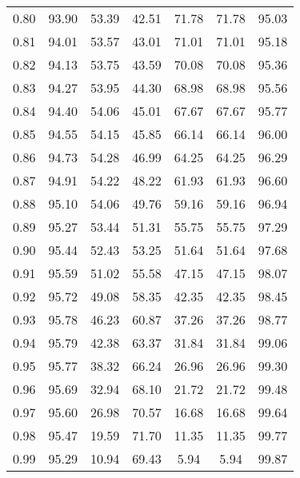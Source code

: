 \begin{tabular}{|c|c|c|c|c|c|c|}
      0.80 &     93.90 &     53.39 &      42.51 &   71.78 &      71.78 &         95.03 \\
      0.81 &     94.01 &     53.57 &      43.01 &   71.01 &      71.01 &         95.18 \\
      0.82 &     94.13 &     53.75 &      43.59 &   70.08 &      70.08 &         95.36 \\
      0.83 &     94.27 &     53.95 &      44.30 &   68.98 &      68.98 &         95.56 \\
      0.84 &     94.40 &     54.06 &      45.01 &   67.67 &      67.67 &         95.77 \\
      0.85 &     94.55 &     54.15 &      45.85 &   66.14 &      66.14 &         96.00 \\
      0.86 &     94.73 &     54.28 &      46.99 &   64.25 &      64.25 &         96.29 \\
      0.87 &     94.91 &     54.22 &      48.22 &   61.93 &      61.93 &         96.60 \\
      0.88 &     95.10 &     54.06 &      49.76 &   59.16 &      59.16 &         96.94 \\
      0.89 &     95.27 &     53.44 &      51.31 &   55.75 &      55.75 &         97.29 \\
      0.90 &     95.44 &     52.43 &      53.25 &   51.64 &      51.64 &         97.68 \\
      0.91 &     95.59 &     51.02 &      55.58 &   47.15 &      47.15 &         98.07 \\
      0.92 &     95.72 &     49.08 &      58.35 &   42.35 &      42.35 &         98.45 \\
      0.93 &     95.78 &     46.23 &      60.87 &   37.26 &      37.26 &         98.77 \\
      0.94 &     95.79 &     42.38 &      63.37 &   31.84 &      31.84 &         99.06 \\
      0.95 &     95.77 &     38.32 &      66.24 &   26.96 &      26.96 &         99.30 \\
      0.96 &     95.69 &     32.94 &      68.10 &   21.72 &      21.72 &         99.48 \\
      0.97 &     95.60 &     26.98 &      70.57 &   16.68 &      16.68 &         99.64 \\
      0.98 &     95.47 &     19.59 &      71.70 &   11.35 &      11.35 &         99.77 \\
      0.99 &     95.29 &     10.94 &      69.43 &    5.94 &       5.94 &         99.87 \\
\bottomrule
\end{tabular}
